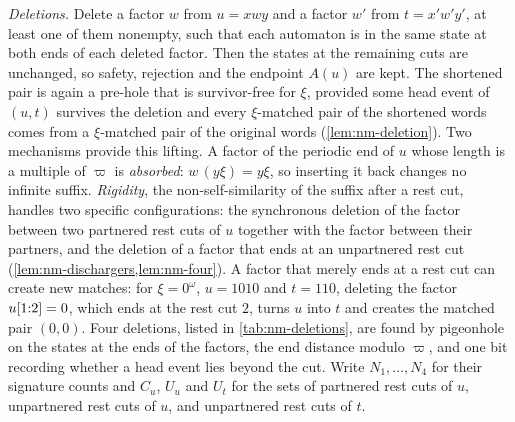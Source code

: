 \emph{Deletions.} Delete a factor $w$ from $u=xwy$ and a factor $w'$ from
$t=x'w'y'$, at least one of them nonempty, such that each automaton is in the
same state at both ends of each deleted factor. Then the states at the
remaining cuts are unchanged, so safety, rejection and the endpoint $A(u)$ are
kept. The shortened pair is again a pre-hole that is survivor-free for $\xi$,
provided some head event of $(u,t)$ survives the deletion and every
$\xi$-matched pair of the shortened words comes from a $\xi$-matched pair of the
original words (\cref{lem:nm-deletion}). Two mechanisms provide this lifting.
A factor of the periodic end of $u$ whose length is a multiple of $\varpi$ is
\emph{absorbed}: $w\,(y\xi)=y\xi$, so inserting it back changes no infinite
suffix. \emph{Rigidity}, the non-self-similarity of the suffix after a rest
cut, handles two specific configurations: the synchronous deletion of the
factor between two partnered rest cuts of $u$ together with the factor between
their partners, and the deletion of a factor that ends at an unpartnered rest
cut (\cref{lem:nm-dischargers,lem:nm-four}). A factor that merely ends at a rest
cut can create new matches: for $\xi=0^\omega$, $u=1010$ and $t=110$, deleting
the factor $u[1{:}2]=0$, which ends at the rest cut $2$, turns $u$ into $t$
and creates the matched pair $(0,0)$. Four deletions, listed in
\cref{tab:nm-deletions}, are found by pigeonhole on the states at the ends of
the factors, the end distance modulo $\varpi$, and one bit recording whether a
head event lies beyond the cut. Write $N_1,\dots,N_4$ for their signature counts
and $C_u$, $U_u$ and $U_t$ for the sets of partnered rest cuts of $u$,
unpartnered rest cuts of $u$, and unpartnered rest cuts of $t$.

